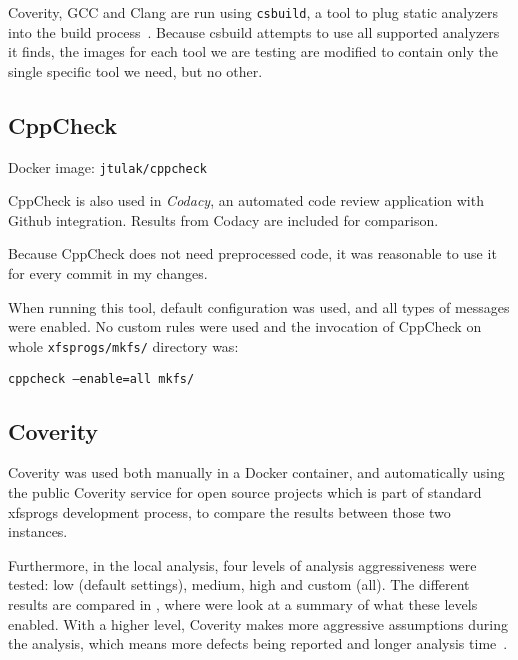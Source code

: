 Coverity, GCC and Clang are run using {\tt csbuild}, a tool to plug static
analyzers into the build process~\cite{csbuildMan}. Because csbuild attempts to
use all supported analyzers it finds, the images for each tool we are testing
are modified to contain only the single specific tool we need, but no other.
%
\subsection{CppCheck}
Docker image: {\tt jtulak/cppcheck}~\cite{dockerCPPCheck}

CppCheck is also used in {\em Codacy}, an automated code review application
with Github integration. Results from Codacy are included for comparison.

Because CppCheck does not need preprocessed code, it was reasonable to use
it for every commit in my changes.

When running this tool, default configuration was used, and all types of
messages were enabled. No custom rules were used and the invocation of
CppCheck on whole {\tt xfsprogs/mkfs/} directory was:

{\tt cppcheck --enable=all mkfs/}


\subsection{Coverity}
Coverity was used both manually in a Docker container, and automatically
using the public Coverity service for open source projects which is part
of standard xfsprogs development process, to compare the results between
those two instances.

Furthermore, in the local analysis, four levels of analysis aggressiveness were
tested: low (default settings), medium, high and custom (all). The different
results are compared in , where were look at a
summary of what these levels enabled. With a higher level, Coverity makes more
aggressive assumptions during the analysis, which means more defects being
reported and longer analysis time~\cite{coverityMan}.

